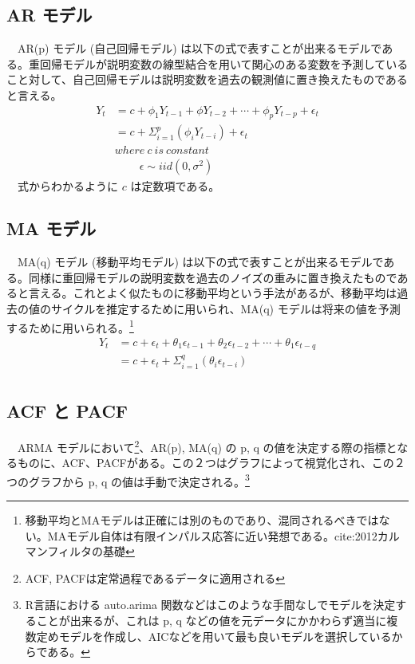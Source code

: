 \documentclass{scrartcl}
\begin{document}
\subsection{AR モデル}
\label{sec:org39efc52}
　AR(p) モデル (自己回帰モデル) は以下の式で表すことが出来るモデルである。重回帰モデルが説明変数の線型結合を用いて関心のある変数を予測していること対して、自己回帰モデルは説明変数を過去の観測値に置き換えたものであると言える。\\
\begin{align}
Y_t &= c + \phi_1  Y_{t-1} +\phi Y_{t-2} + \cdots + \phi_p  Y_{t-p} + \epsilon_t \nonumber \\
&= c + \Sigma_{i=1}^{p} (\phi_i  Y_{t-i}) +\epsilon_t  \nonumber \\
&where \  c \ is\  constant \ \nonumber \\ 
&\ \ \ \ \ \ \ \ \ \ \epsilon \sim iid(0, \sigma^2)
\end{align}
　式からわかるように \(c\) は定数項である。\\
\subsection{MA モデル}
\label{sec:orgdbb3252}
　MA(q) モデル (移動平均モデル) は以下の式で表すことが出来るモデルである。同様に重回帰モデルの説明変数を過去のノイズの重みに置き換えたものであると言える。これとよく似たものに移動平均という手法があるが、移動平均は過去の値のサイクルを推定するために用いられ、MA(q) モデルは将来の値を予測するために用いられる。\footnote{移動平均とMAモデルは正確には別のものであり、混同されるべきではない。MAモデル自体は有限インパルス応答に近い発想である。cite:2012カルマンフィルタの基礎}\\

\begin{align}
Y_t &= c + \epsilon_t + \theta_1 \epsilon_{t-1} + \theta_2 \epsilon_{t-2} + \cdots + \theta_1 \epsilon_{t-q}   \nonumber \\
&= c + \epsilon_t + \Sigma_{i=1}^{q} (\theta_i \epsilon_{t-i})  \nonumber \\
\end{align}
\subsection{ACF と PACF}
\label{sec:org5e8f064}
　ARMA モデルにおいて\footnote{ACF, PACFは定常過程であるデータに適用される}、AR(p), MA(q) の p, q の値を決定する際の指標となるものに、ACF、PACFがある。この２つはグラフによって視覚化され、この２つのグラフから p, q の値は手動で決定される。\footnote{R言語における auto.arima 関数などはこのような手間なしでモデルを決定することが出来るが、これは p, q などの値を元データにかかわらず適当に複数定めモデルを作成し、AICなどを用いて最も良いモデルを選択しているからである。} \cite{stat510}
\end{document}
